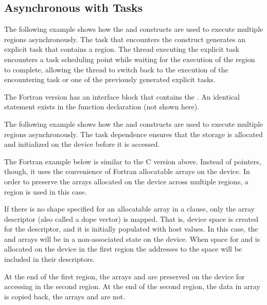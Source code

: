 \subsection{Asynchronous  with Tasks}
\label{subsec:async_target_with_tasks}

The following example shows how the  and  constructs 
are used to execute multiple  regions asynchronously. The task that 
encounters the  construct generates an explicit task that contains 
a  region. The thread executing the explicit task encounters a task 
scheduling point while waiting for the execution of the  region 
to complete, allowing the thread to switch back to the execution of the encountering 
task or one of the previously generated explicit tasks.


The Fortran version has an interface block that contains the  . 
An identical statement exists in the function declaration (not shown here).


The following example shows how the  and  constructs 
are used to execute multiple  regions asynchronously. The task dependence 
ensures that the storage is allocated and initialized on the device before it is 
accessed.


The Fortran example below is similar to the C version above. Instead of pointers, though, it uses
the convenience of Fortran allocatable arrays on the device. In order to preserve the arrays 
allocated on the device across multiple  regions, a ~ region 
is used in this case.

If there is no shape specified for an allocatable array in a  clause, only the array descriptor
(also called a dope vector) is mapped. That is, device space is created for the descriptor, and it
is initially populated with host values. In this case, the  and  arrays will be in a
non-associated state on the device. When space for  and  is allocated on the device
in the first  region the addresses to the space will be included in their descriptors.

At the end of the first  region, the arrays  and  are preserved on the device 
for accessing in the second  region. At the end of the second  region, the data 
in array  is copied back, the arrays  and  are not.

